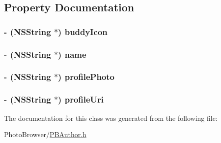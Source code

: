 \subsection{Property Documentation}
\hypertarget{interface_p_b_author_ae8e79b8596c2100b5129022d2f1beca2}{
\subsubsection[{buddyIcon}]{\setlength{\rightskip}{0pt plus 5cm}-\/ ({\bf NSString} $\ast$) buddyIcon}}
\label{interface_p_b_author_ae8e79b8596c2100b5129022d2f1beca2}
\hypertarget{interface_p_b_author_afc8ccc6676addc3b49a494b2bf969c68}{
\subsubsection[{name}]{\setlength{\rightskip}{0pt plus 5cm}-\/ ({\bf NSString} $\ast$) name}}
\label{interface_p_b_author_afc8ccc6676addc3b49a494b2bf969c68}
\hypertarget{interface_p_b_author_a15ca8bbd4cd613fdd6bf4a81006598fa}{
\subsubsection[{profilePhoto}]{\setlength{\rightskip}{0pt plus 5cm}-\/ ({\bf NSString} $\ast$) profilePhoto}}
\label{interface_p_b_author_a15ca8bbd4cd613fdd6bf4a81006598fa}
\hypertarget{interface_p_b_author_af7d074aa8861356ca9427098d9a97af8}{
\subsubsection[{profileUri}]{\setlength{\rightskip}{0pt plus 5cm}-\/ ({\bf NSString} $\ast$) profileUri}}
\label{interface_p_b_author_af7d074aa8861356ca9427098d9a97af8}


The documentation for this class was generated from the following file:\begin{DoxyCompactItemize}
\item 
PhotoBrowser/\hyperlink{_p_b_author_8h}{PBAuthor.h}\end{DoxyCompactItemize}
